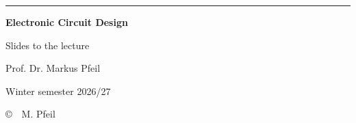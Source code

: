 \documentclass[12pt,a5paper,landscape,openany]{book}
\begin{document}

\pagecolor{\pagecol}

\sffamily\Large
\thispagestyle{empty}
\vspace*{-2mm}
\rwulogo[height=1.6cm]

\vspace*{1.2cm}
{\color{rwuviolet}\rule{\textwidth}{0.7mm}}

\vspace*{5mm}
{\fontsize{30}{36}\selectfont\bfseries\color{rwuviolet} Electronic Circuit Design}

\vspace*{3mm}
{\Large\color{rwucyandark} Slides to the lecture}
\ifdefined\onlychaptertitle

\vspace*{3mm}
{\Large\bfseries\color{rwuviolet} \onlychaptertitle}
\fi

\vspace*{6mm}
{\large Prof. Dr. Markus Pfeil}

\vspace*{4mm}
{\large Winter semester 2026/27}

\vfill
{\scriptsize\color{rwugray} \copyright~~M. Pfeil}
\newpage

\begin{center}\parbox{0.6\textwidth}{\large \parskip -2mm
\tableofcontents}
\end{center}

\baselineskip 5mm
\nocite{*}
\def\refname{Literatur}


\renewcommand{\chapter}[1]{\refstepcounter{chapter}\newpage
       \textcolor{headcol}{\begin{center}\Huge\bfseries
      \thechapter~ #1\end{center}}\addcontentsline{toc}{chapter}{#1}
}


\end{document}
